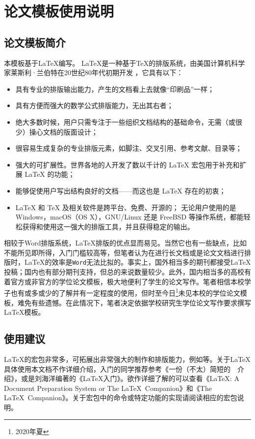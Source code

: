 \chapter{论文模板使用说明}
\graphicspath{{figures/chap02/}}
\section{论文模板简介}
本模板基于\LaTeX{}编写。 \LaTeX{}是一种基于\TeX{}的排版系统，由美国计算机科学家莱斯利·兰伯特在20世纪80年代初期开发 \cite{维基百科2020}，它具有以下\cite{CTEX开发小组2020}：

\begin{itemize}
    \item 具有专业的排版输出能力，产生的文档看上去就像“印刷品”一样；
    \item 具有方便而强大的数学公式排版能力，无出其右者；
    \item 绝大多数时候，用户只需专注于一些组织文档结构的基础命令，无需（或很少）操心文档的版面设计；
    \item 很容易生成复杂的专业排版元素，如脚注、交叉引用、参考文献、目录等；
    \item 强大的可扩展性。世界各地的人开发了数以千计的 \LaTeX{} 宏包用于补充和扩展 \LaTeX{} 的功能；
    \item 能够促使用户写出结构良好的文档——而这也是 \LaTeX{} 存在的初衷；
    \item \LaTeX{} 和 \TeX{} 及相关软件是跨平台、免费、开源的；
    无论用户使用的是 Windows，macOS（OS X），GNU/Linux 还是 FreeBSD 等操作系统，都能轻松获得和使用这一强大的排版工具，并且获得稳定的输出。
  \end{itemize}

相较于Word排版系统，\LaTeX{}排版的优点显而易见。当然它也有一些缺点，比如不能所见即所得，入门门槛较高等，但笔者认为在进行长文档或是论文文档进行排版时，\LaTeX{}的效率是\texttt{Word}无法比拟的。事实上，国外相当多的期刊都接受\LaTeX{}投稿；国内也有部分期刊支持，但总的来说数量较少。此外，国内相当多的高校有着官方或非官方的学位论文模板，极大地便利了学生的论文写作。笔者相信本校学子也有或多或少的了解并有一定程度的使用，但时至今日\footnote{2020年夏}未见本校的学位论文模板，难免有些遗憾。在此情况下，笔者决定依据学校研究生学位论文写作要求撰写\LaTeX{}模板。

\section{使用建议}
\LaTeX{}的宏包非常多，可拓展出非常强大的制作和排版能力，例如等。关于\LaTeX{}具体使用本文档不作详细介绍，入门的同学推荐参考《一份（不太）简短的~\LaTeXe{}~介绍》\cite{CTEX开发小组2020}，或是刘海洋编著的《\LaTeX{}入门》\cite{刘海洋2013}。欲作详细了解的可以查看《\LaTeX{}: A Document Preparation System or The \LaTeX{}~Companion》\cite{Lamport1994}和《The \LaTeX{}~Companion》\cite{Mittelbach2004}。关于宏包中的命令或特定功能的实现请阅读相应的宏包说明。

